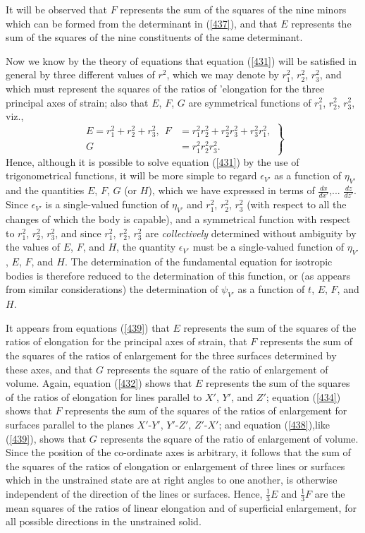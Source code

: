 \documentclass[12pt]{article}
\begin{document}
{It will be observed that $F$ represents the sum of the squares of the nine minors which can be formed from the determinant in (\ref{437}), and that $E$ represents the sum of the squares of the nine constituents of the same determinant.


Now we know by the theory of equations that equation (\ref{431}) will be satisfied in general by three different values of $r^2$, which we may denote by $r_1^2$, $r_2^2$, $r_3^2$, and which must represent the squares of the ratios of 'elongation for the three principal axes of strain; also that $E$, $F$, $G$ are symmetrical functions of $r_1^2$, $r_2^2$, $r_3^2$, viz.,
\begin{equation} \left. \begin{aligned}
E=r_1^2+r_2^2+r_3^2, \ \ F&=r_1^2r_2^2+r_2^2 r_3^2 +r_3^2 r_1^2, \\
G &= r_1^2 r_2^2 r_3^2.
\end{aligned} \right\} \label{439}\end{equation}
Hence, although it is possible to solve equation (\ref{431}) by the use of trigonometrical functions, it will be more simple to regard $\epsilon_{V'}$ as a function of $\eta_{V'}$ and the quantities $E$, $F$, $G$ (or $H$), which we have expressed in terms of $\frac{dx}{dx'}$,... $\frac{dz}{dz'}$. Since $\epsilon_{V'}$ is a single-valued function of $\eta_{V'}$ and $r_1^2$, $r_2^2$, $r_3^2$ (with respect to all the changes of which the body is capable), and a symmetrical function with respect to $r_1^2$, $r_2^2$, $r_3^2$, and since $r_1^2$, $r_2^2$, $r_3^2$ are \textit{collectively} determined without ambiguity by the values of $E$, $F$, and $H$, the quantity $\epsilon_{V'}$ must be a single-valued function of $\eta_{V'}$, $E$, $F$, and $H$. The determination of the fundamental equation for isotropic bodies is therefore reduced to the determination of this function, or (as appears from similar considerations) the determination of $\psi_{V'}$ as a function of $t$, $E$, $F$, and $H$.


It appears from equations (\ref{439}) that $E$ represents the sum of the squares of the ratios of elongation for the principal axes of strain, that $F$ represents the sum of the squares of the ratios of enlargement for the three surfaces determined by these axes, and that $G$ represents the square of the ratio of enlargement of volume. Again, equation (\ref{432}) shows that $E$ represents the sum of the squares of the ratios of elongation for lines parallel to $X'$, $Y'$, and $Z'$; equation (\ref{434}) shows that $F$ represents the sum of the squares of the ratios of enlargement for surfaces parallel to the planes $X'$-$Y'$, $Y'$-$Z'$, $Z'$-$X'$; and equation (\ref{438}),like (\ref{439}), shows that $G$ represents the square of the ratio of enlargement of volume. Since the position of the co-ordinate axes is arbitrary, it follows that the sum of the squares of the ratios of elongation or enlargement of three lines or surfaces which in the unstrained state are at right angles to one another, is otherwise independent of the direction of the lines or surfaces. Hence, $\frac{1}{3}E$ and $\frac{1}{3}F$ are the mean squares of the ratios of linear elongation and of superficial enlargement, for all possible directions in the unstrained solid.


}
\end{document}
